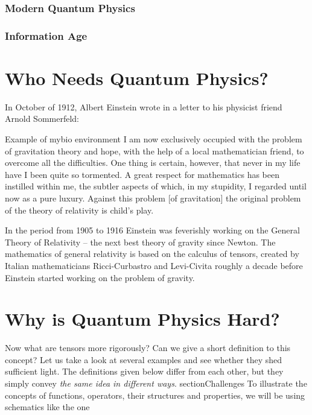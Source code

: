 \subsubsection*{Modern Quantum Physics}

\subsubsection*{Information Age}


\section{Who Needs Quantum Physics?}

In October of 1912, Albert Einstein wrote in a letter to his physicist
friend Arnold Sommerfeld:
\begin{mybio}{Example of mybio environment}
  I am now exclusively occupied with the problem of gravitation theory
and hope, with the help of a local mathematician friend, to overcome
all the difficulties. One thing is certain, however, that never in my
life have I been quite so tormented. A great respect for mathematics
has been instilled within me, the subtler aspects of which, in my stupidity,
I regarded until now as a pure luxury. Against this problem [of
  gravitation] the original problem of the theory of relativity is
child’s play.
\end{mybio}
In the period from 1905 to 1916 Einstein was feverishly working on the
General Theory of Relativity -- the next
best theory of gravity since
Newton. The mathematics of general relativity is based on the calculus
of tensors, created by Italian mathematicians Ricci-Curbastro and
Levi-Civita roughly a decade before Einstein started working on the
problem of gravity.


\section{Why is Quantum Physics Hard?}\label{sec:WhyQuantumHard}
Now what are tensors more rigorously? Can we give a short definition
to this concept?
Let us take a look at several examples and see whether they shed
sufficient light. The definitions given below differ from each other,
but they simply convey \emph{the same idea in different ways}.
section{Challenges}
To illustrate the concepts of functions, operators, their structures and
properties, we will be using schematics like the one

